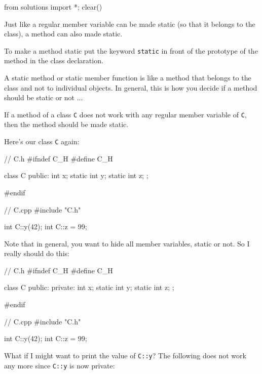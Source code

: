 \begin{python0}
from solutions import *; clear()
\end{python0}

Just like a regular member variable can be made static (so that it
belongs to the class), a method can also made static.

To make a method static put the keyword \texttt{static} in front of the
prototype of the method in the class declaration.

A static method or static member function is like a method that belongs
to the class and not to individual objects. In general, this is how you
decide if a method should be static or not ...

If a method of a class \texttt{C} does not work with any regular member
variable of \texttt{C}, then the method should be made static.


Here's our class \texttt{C} again:

\begin{consolethree}[escapeinside=||]
// C.h
#ifndef C_H
#define C_H

class C
{
public:
    int x;
    static int y;
    static int z;
};

#endif
\end{consolethree}

\begin{consolethree}[escapeinside=||]
// C.cpp
#include "C.h"

int C::y(42);
int C::z = 99;
\end{consolethree}

Note that in general, you want to hide all member variables, static or
not. So I really should do this:

\begin{consolethree}[escapeinside=||]
// C.h
#ifndef C_H
#define C_H

class C
{
public:
private:
    int x;
    static int y;
    static int z;
};

#endif
\end{consolethree}

\begin{consolethree}[escapeinside=||]
// C.cpp
#include "C.h"

int C::y(42);
int C::z = 99;
\end{consolethree}

What if I might want to print the value of \texttt{C::y}? The following
does not work any more since \texttt{C::y} is now private:

